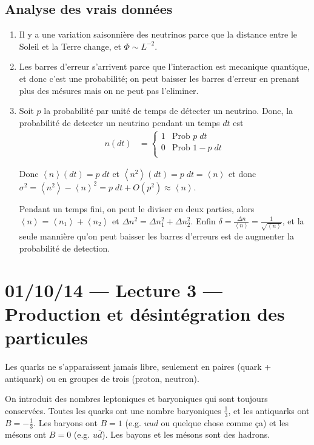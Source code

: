 \documentclass[10pt]{report}
\newcommand{\expvalue}[1]{\left<#1\right>}
\begin{document}
\section{Analyse des vrais donn\'ees}

\begin{enumerate}[1.]
    \item Il y a une variation saisonni\`ere des neutrinos parce que la distance entre le Soleil et la Terre change, et $\Phi \sim L^{-2}$. 
    \item Les barres d'erreur s'arrivent parce que l'interaction est mecanique quantique, et donc c'est une probabilit\'e; on peut baisser les barres d'erreur en prenant plus des m\'esures mais on ne peut pas l'eliminer.
    \item Soit $p$ la probabilit\'e par unit\'e de temps de d\'etecter un neutrino. Donc, la probabilit\'e de detecter un neutrino pendant un temps $dt$ est
        \begin{align}
            n(dt) &= 
            \begin{cases}
                1 & \mbox{Prob } p\;dt\\
                0 & \mbox{Prob } 1 - p\;dt\\
            \end{cases}
        \end{align}

        Donc $\expvalue{n}(dt) = p\;dt$ et $\expvalue{n^2}(dt) = p\;dt = \expvalue{n}$ et donc $\sigma^2 = \expvalue{n^2} - \expvalue{n}^2 = p\;dt + O(p^2) \approx \expvalue{n}$. 


        Pendant un temps fini, on peut le diviser en deux parties, alors $\expvalue{n} = \expvalue{n_1} + \expvalue{n_2}$ et $\Delta n^2 = \Delta n_1^2 + \Delta n_2^2$. Enfin $\delta = \frac{\Delta n}{\expvalue{n}} = \frac{1}{\sqrt{\expvalue{n}}}$, et la seule manni\`ere qu'on peut baisser les barres d'erreurs est de augmenter la probabilit\'e de detection.
\end{enumerate}
\chapter{01/10/14 --- Lecture 3 --- Production et d\'esint\'egration des particules}

Les quarks ne s'apparaissent jamais libre, seulement en paires (quark + antiquark) ou en groupes de trois (proton, neutron). 

On introduit des nombres leptoniques et baryoniques qui sont toujours conserv\'ees. Toutes les quarks ont une nombre baryoniques $\frac{1}{3}$, et les antiquarks ont $B = -\frac{1}{3}$. Les baryons ont $B=1$ (e.g. $uud$ ou quelque chose comme \c{c}a) et les m\'esons ont $B=0$ (e.g. $u\bar{d}$). Les bayons et les m\'esons sont des hadrons.
\end{document}

